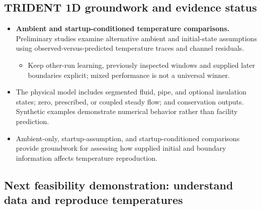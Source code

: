 \subsection{TRIDENT 1D groundwork and evidence status}\label{subsec:trident-1d-groundwork-and-evidence-status}
\begin{itemize}[leftmargin=*]
\item {}\textbf{Ambient and startup-conditioned temperature comparisons.} Preliminary studies examine alternative ambient and initial-state assumptions using observed-versus-predicted temperature traces and channel residuals.
\begin{itemize}
\item Keep other-run learning, previously inspected windows and supplied later boundaries explicit; mixed performance is not a universal winner.
\end{itemize}

\item The physical model includes segmented fluid, pipe, and optional insulation states; zero, prescribed, or coupled steady flow; and conservation outputs. Synthetic examples demonstrate numerical behavior rather than facility prediction.
\item Ambient-only, startup-assumption, and startup-conditioned comparisons provide groundwork for assessing how supplied initial and boundary information affects temperature reproduction.
\end{itemize}

\subsection{Next feasibility demonstration: understand data and reproduce temperatures}\label{subsec:next-feasibility-demonstration-understand-data-and-reproduce-temperatures}

